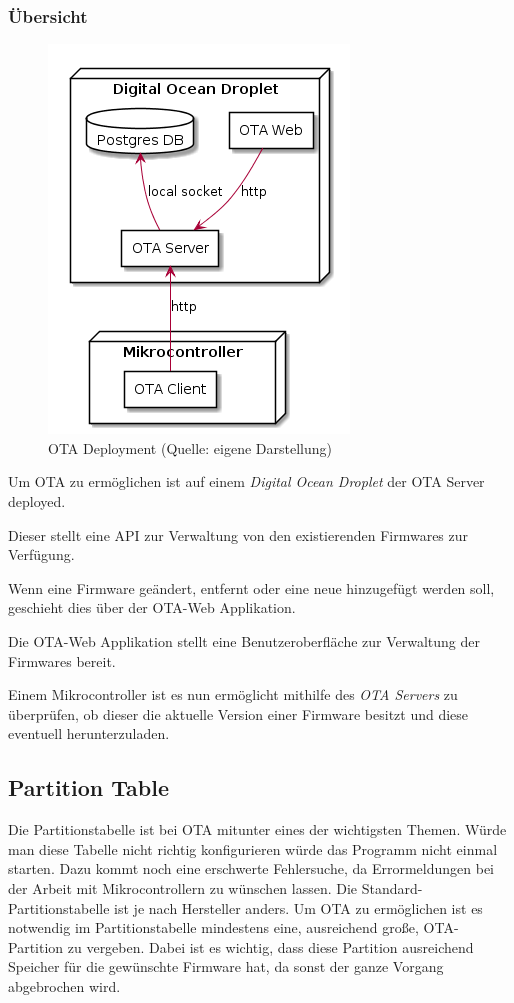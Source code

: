 \subsubsection{Übersicht}
\begin{figure}[H]
    \begin{center}
        \includegraphics[scale=0.6]{diagrams/ota_deployment.png}
        \caption{OTA Deployment (Quelle: eigene Darstellung)}
    \end{center}
\end{figure}

Um OTA zu ermöglichen ist auf einem \textit{Digital Ocean Droplet} der OTA Server deployed. 

Dieser stellt eine API zur Verwaltung von den existierenden Firmwares zur Verfügung.  

Wenn eine Firmware geändert, entfernt oder eine neue hinzugefügt werden soll, geschieht dies über der OTA-Web Applikation.

Die OTA-Web Applikation stellt eine Benutzeroberfläche zur Verwaltung der Firmwares bereit.

Einem Mikrocontroller ist es nun ermöglicht mithilfe des \textit{OTA Servers} zu überprüfen, ob dieser die aktuelle Version einer Firmware besitzt und diese eventuell herunterzuladen.

\subsection{Partition Table}\label{sec:ota-partition-table}
Die Partitionstabelle ist bei OTA mitunter eines der wichtigsten Themen. Würde man diese Tabelle nicht richtig konfigurieren würde das Programm nicht einmal starten. Dazu kommt noch eine erschwerte Fehlersuche, da Errormeldungen bei der Arbeit mit Mikrocontrollern zu wünschen lassen.
Die Standard-Partitionstabelle ist je nach Hersteller anders. Um OTA zu ermöglichen ist es notwendig im Partitionstabelle mindestens eine, ausreichend große, OTA-Partition zu vergeben. Dabei ist es wichtig, dass diese Partition ausreichend Speicher für die gewünschte Firmware hat, da sonst der ganze Vorgang abgebrochen wird.

